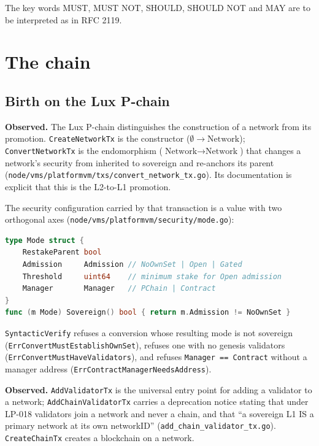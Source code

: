 \documentclass[11pt,a4paper]{article}
\theoremstyle{definition}
\theoremstyle{remark}
\newcommand{\code}[1]{\texttt{#1}}
\begin{document}
The key words MUST, MUST NOT, SHOULD, SHOULD NOT and MAY are to be interpreted
as in RFC 2119.

\section{The chain}
\label{sec:chain}

\subsection{Birth on the Lux P-chain}

\textbf{Observed.} The Lux P-chain distinguishes the construction of a network
from its promotion. \code{CreateNetworkTx} is the constructor
($\emptyset \to \text{Network}$); \code{ConvertNetworkTx} is the endomorphism
($\text{Network} \to \text{Network}$) that changes a network's security from
inherited to sovereign and re-anchors its parent
(\code{node/vms/platformvm/txs/convert\_network\_tx.go}). Its documentation is
explicit that this is the L2-to-L1 promotion.

The security configuration carried by that transaction is a value with two
orthogonal axes (\code{node/vms/platformvm/security/mode.go}):

\begin{lstlisting}[language=Go]
type Mode struct {
    RestakeParent bool
    Admission     Admission // NoOwnSet | Open | Gated
    Threshold     uint64    // minimum stake for Open admission
    Manager       Manager   // PChain | Contract
}
func (m Mode) Sovereign() bool { return m.Admission != NoOwnSet }
\end{lstlisting}

\code{SyntacticVerify} refuses a conversion whose resulting mode is not
sovereign (\code{ErrConvertMustEstablishOwnSet}), refuses one with no genesis
validators (\code{ErrConvertMustHaveValidators}), and refuses
\code{Manager == Contract} without a manager address
(\code{ErrContractManagerNeedsAddress}).

\textbf{Observed.} \code{AddValidatorTx} is the universal entry point for
adding a validator to a network; \code{AddChainValidatorTx} carries a
deprecation notice stating that under LP-018 validators join a network and never
a chain, and that ``a sovereign L1 IS a primary network at its own networkID''
(\code{add\_chain\_validator\_tx.go}). \code{CreateChainTx} creates a blockchain
on a network.
\end{document}
